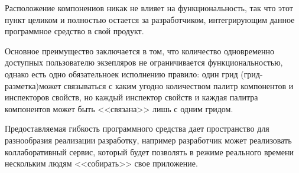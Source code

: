 Расположение компонениов никак не влияет на функциональность, так что этот пункт целиком и полностью остается за разработчиком, интегрирующим данное программное средство в свой продукт.

Основное преимущество заключается в том, что количество одновременно доступных пользователю экзепляров не ограничивается функциональностью, однако есть одно обязательноек исполнению правило: один грид (грид-разметка)может связываться с каким угодно количеством палитр компонентов и инспекторов свойств, но каждый инспектор свойств и каждая палитра компонентов может быть <<связана>> лишь с одним гридом.

Предоставляемая гибкость программного средства дает пространство для разнообразия реализации разработку, например разработчик может реализовать коллаборативный сервис, который будет позволять в режиме реального времени нескольким людям <<собирать>> свое приложение.
